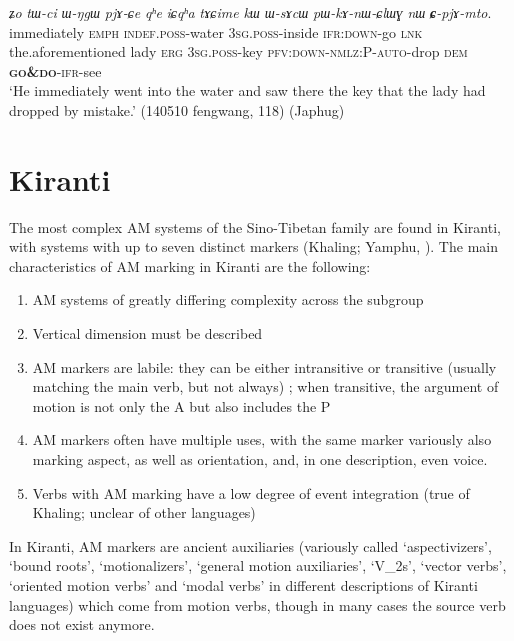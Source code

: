 \documentclass[oneside,a4paper,11pt]{article}
\newcommand{\ipa}[1]{{\phon\textit{#1}}}
\newcommand{\rouge}[1]{\textbf{#1}}
\begin{document}
\begin{exe}
\ex  \label{ex:CpjAmto}
\gll  \ipa{nɯɕɯmɯma}	\ipa{ʑo}	\ipa{tɯ-ci}	\ipa{ɯ-ŋgɯ}	\ipa{pjɤ-ɕe}	\ipa{qʰe}	\ipa{iɕqʰa}	\ipa{tɤɕime}	\ipa{kɯ}	\ipa{ɯ-sɤcɯ}	\ipa{pɯ-kɤ-nɯ-ɕlɯɣ}	\ipa{nɯ}	\ipa{\rouge{ɕ}-pjɤ-mto}. \\
immediately \textsc{emph} \textsc{indef}.\textsc{poss}-water \textsc{3sg}.\textsc{poss}-inside \textsc{ifr}:\textsc{down}-go \textsc{lnk} the.aforementioned lady \textsc{erg} \textsc{3sg}.\textsc{poss}-key \textsc{pfv}:\textsc{down}-\textsc{nmlz}:P-\textsc{auto}-drop \textsc{dem} \rouge{\textsc{go\&do}}-\textsc{ifr}-see \\
\glt `He immediately went into the water and saw there the key that the lady had dropped by mistake.' (140510 fengwang, 118) (Japhug)
\end{exe}

\section{Kiranti}  
The most complex AM systems of the Sino-Tibetan family are found in Kiranti, with systems with up to seven distinct markers (Khaling; Yamphu, \citealt[137-194]{rutgers98yamphu}).
The main characteristics of AM marking in Kiranti are the following:

\begin{enumerate}
\item AM systems of greatly differing complexity across the subgroup
\item Vertical dimension must be described
\item AM markers are labile: they can be either intransitive or transitive (usually matching the main verb, but not always) ; when transitive, the argument of motion is not only the A but also includes the P
\item AM markers often have multiple uses, with the same marker variously also marking aspect, as well as orientation, and, in one description, even voice.
\item Verbs with AM marking have a low degree of event integration (true of Khaling; unclear of other languages)
\end{enumerate}


In Kiranti, AM markers are ancient auxiliaries (variously called `aspectivizers', `bound roots', `motionalizers',   `general motion auxiliaries', `V_2s', `vector verbs', `oriented motion verbs' and `modal verbs' in different descriptions of Kiranti languages) which come from motion verbs, though in many cases the source verb does not exist anymore. 
 
\end{document}
